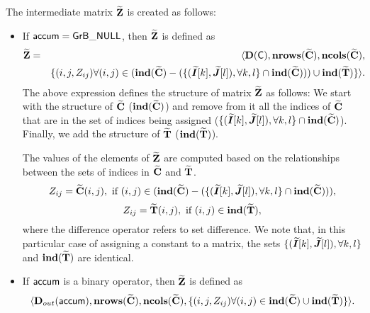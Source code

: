 The intermediate matrix ${\bf \widetilde{Z}}$ is created as follows:
\begin{itemize}
    \item If ${\sf accum} = {\sf GrB\_NULL}$, then ${\bf \widetilde{Z}}$ is defined as 
    \begin{eqnarray}
        {\bf \widetilde{Z}} & = &
		\langle \bold{D}({\sf C}),\bold{nrows}({\bf \widetilde{C}}),
        \bold{ncols}({\bf \widetilde{C}}), \nonumber \\
    & & \{(i,j,Z_{ij})  \forall (i,j) \in
        (\bold{ind}({\bf \widetilde{C}}) - (\{
            (\bm{\widetilde{I}}[k],\bm{\widetilde{J}}[l]),
            \forall k,l\} \cap \bold{ind}({\bf \widetilde{C}}))) \cup
        \bold{ind}({\bf \widetilde{T}}) \} \rangle. \nonumber
    \end{eqnarray}
    The above expression defines the structure of matrix ${\bf \widetilde{Z}}$ as follows:
    We start with the structure of ${\bf \widetilde{C}}$ ($\bold{ind}({\bf \widetilde{C}})$) and remove from 
    it all the indices of ${\bf \widetilde{C}}$ that are
    in the set of indices being assigned ($\{(\bm{\widetilde{I}}[k],\bm{\widetilde{J}}[l]),\forall k,l\} \cap \bold{ind}({\bf \widetilde{C}})$). Finally, we
    add the structure of ${\bf \widetilde{T}}$ ($\bold{ind}({\bf \widetilde{T}})$).

    The values of the elements of ${\bf \widetilde{Z}}$ are computed based on the 
    relationships between the sets of indices in ${\bf \widetilde{C}}$ and 
    ${\bf \widetilde{T}}$.
\[
    Z_{ij} = {\bf \widetilde{C}}(i,j), \mbox{~if~}  (i,j) \in  
    (\bold{ind}({\bf \widetilde{C}}) - (\{ (\bm{\widetilde{I}}[k],\bm{\widetilde{J}}[l]), \forall k, l\}
    \cap \bold{ind}({\bf \widetilde{C}}))),
\]
\[
    Z_{ij} = {\bf \widetilde{T}}(i,j), \ \mbox{if}\ (i,j) \in  
    \bold{ind}({\bf \widetilde{T}}),
\]
where the difference operator refers to set difference.
We note that, in this particular case of assigning a constant to a matrix, the sets
$\{ (\bm{\widetilde{I}}[k],\bm{\widetilde{J}}[l]), \forall k, l\}$ and
$\bold{ind}({\bf \widetilde{T}})$ are identical.

    \item If ${\sf accum}$ is a binary operator, then ${\bf \widetilde{Z}}$ is defined as
        \[ \langle \mbox{$\mathbf{D}_{out}$}({\sf accum}), \bold{nrows}({\bf \widetilde{C}}), \bold{ncols}({\bf \widetilde{C}}),
        \{(i,j,Z_{ij})  \forall (i,j) \in \bold{ind}({\bf \widetilde{C}}) \cup 
        \bold{ind}({\bf \widetilde{T}}) \} \rangle.\]


\end{itemize}
